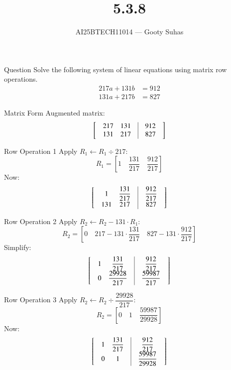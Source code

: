 \documentclass{beamer}
\title{5.3.8}
\author{AI25BTECH11014 — Gooty Suhas}
\begin{document}
\frame{\titlepage}

\begin{frame}{Question}
Solve the following system of linear equations using matrix row operations.  
\[
\begin{aligned}
217a + 131b &= 912 \\
131a + 217b &= 827
\end{aligned}
\]
\end{frame}

\begin{frame}{Matrix Form}
Augmented matrix:
\[
\left[
\begin{array}{@{\hskip 10pt}c@{\hskip 10pt}c@{\hskip 10pt}|@{\hskip 10pt}c@{\hskip 10pt}}
217 & 131 & 912 \\
131 & 217 & 827
\end{array}
\right]
\]
\end{frame}

\begin{frame}{Row Operation 1}
Apply \( R_1 \leftarrow R_1 \div 217 \):
\[
R_1 =
\left[
1 \quad \dfrac{131}{217} \quad \dfrac{912}{217}
\right]
\]
Now:
\[
\left[
\begin{array}{@{\hskip 10pt}c@{\hskip 10pt}c@{\hskip 10pt}|@{\hskip 10pt}c@{\hskip 10pt}}
1 & \dfrac{131}{217} & \dfrac{912}{217} \\
131 & 217 & 827
\end{array}
\right]
\]
\end{frame}

\begin{frame}{Row Operation 2}
Apply \( R_2 \leftarrow R_2 - 131 \cdot R_1 \):
\[
R_2 =
\left[
0 \quad 217 - 131 \cdot \dfrac{131}{217} \quad 827 - 131 \cdot \dfrac{912}{217}
\right]
\]
Simplify:
\[
\left[
\begin{array}{@{\hskip 10pt}c@{\hskip 10pt}c@{\hskip 10pt}|@{\hskip 10pt}c@{\hskip 10pt}}
1 & \dfrac{131}{217} & \dfrac{912}{217} \\
0 & \dfrac{29928}{217} & \dfrac{59987}{217}
\end{array}
\right]
\]
\end{frame}

\begin{frame}{Row Operation 3}
Apply \( R_2 \leftarrow R_2 \div \dfrac{29928}{217} \):
\[
R_2 =
\left[
0 \quad 1 \quad \dfrac{59987}{29928}
\right]
\]
Now:
\[
\left[
\begin{array}{@{\hskip 10pt}c@{\hskip 10pt}c@{\hskip 10pt}|@{\hskip 10pt}c@{\hskip 10pt}}
1 & \dfrac{131}{217} & \dfrac{912}{217} \\
0 & 1 & \dfrac{59987}{29928}
\end{array}
\right]
\]
\end{frame}
\end{document}
